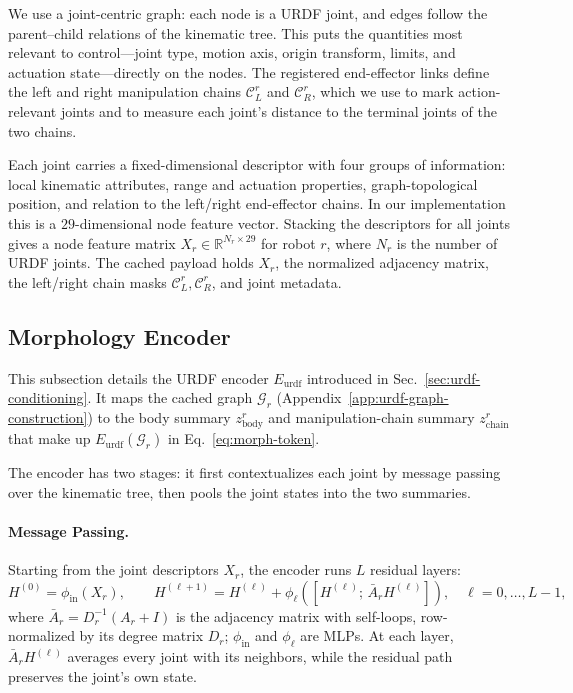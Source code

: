 \documentclass{llmxive}
\begin{document}
We use a joint-centric graph: each node is a URDF joint, and edges follow the parent--child relations of the kinematic tree. This puts the quantities most relevant to control---joint type, motion axis, origin transform, limits, and actuation state---directly on the nodes. The registered end-effector links define the left and right manipulation chains $\mathcal{C}^{r}_{L}$ and $\mathcal{C}^{r}_{R}$, which we use to mark action-relevant joints and to measure each joint's distance to the terminal joints of the two chains.

Each joint carries a fixed-dimensional descriptor with four groups of information: local kinematic attributes, range and actuation properties, graph-topological position, and relation to the left/right end-effector chains. In our implementation this is a $29$-dimensional node feature vector. Stacking the descriptors for all joints gives a node feature matrix $X_r \in \mathbb{R}^{N_r \times 29}$ for robot $r$, where $N_r$ is the number of URDF joints. The cached payload holds $X_r$, the normalized adjacency matrix, the left/right chain masks $\mathcal{C}^{r}_{L}, \mathcal{C}^{r}_{R}$, and joint metadata.


\subsection{Morphology Encoder}
\label{app:morphology-encoder-details}


This subsection details the URDF encoder $E_{\mathrm{urdf}}$ introduced in Sec.~\ref{sec:urdf-conditioning}. It maps the cached graph $\mathcal{G}_r$ (Appendix~\ref{app:urdf-graph-construction}) to the body summary $z_{\mathrm{body}}^{r}$ and manipulation-chain summary $z_{\mathrm{chain}}^{r}$ that make up $E_{\mathrm{urdf}}(\mathcal{G}_r)$ in Eq.~\ref{eq:morph-token}.

The encoder has two stages: it first contextualizes each joint by message passing over the kinematic tree, then pools the joint states into the two summaries.

\paragraph{Message Passing.}
Starting from the joint descriptors $X_r$, the encoder runs $L$ residual layers:
\begin{equation}
    H^{(0)} = \phi_{\mathrm{in}}(X_r),
    \qquad
    H^{(\ell+1)}
    =
    H^{(\ell)}
    +
    \phi_{\ell}
    \!\left(
    \left[
    H^{(\ell)};\,
    \bar{A}_r H^{(\ell)}
    \right]
    \right),
    \quad \ell = 0,\dots,L-1,
\end{equation}
where $\bar{A}_r = D_r^{-1}(A_r + I)$ is the adjacency matrix with self-loops, row-normalized by its degree matrix $D_r$; $\phi_{\mathrm{in}}$ and $\phi_{\ell}$ are MLPs. At each layer, $\bar{A}_r H^{(\ell)}$ averages every joint with its neighbors, while the residual path preserves the joint's own state.
\end{document}
